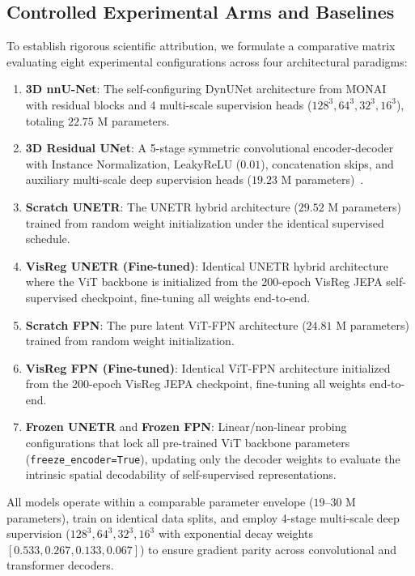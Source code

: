 \documentclass{article}
\begin{document}
\subsection{Controlled Experimental Arms and Baselines}
\label{sec:baselines}

To establish rigorous scientific attribution, we formulate a comparative matrix evaluating eight experimental configurations across four architectural paradigms:
\begin{enumerate}
    \item \textbf{3D nnU-Net}: The self-configuring DynUNet architecture from MONAI~\citep{isensee2021nnunet} with residual blocks and 4 multi-scale supervision heads ($128^3, 64^3, 32^3, 16^3$), totaling $22.75\text{ M}$ parameters.
    \item \textbf{3D Residual UNet}: A 5-stage symmetric convolutional encoder-decoder with Instance Normalization, LeakyReLU ($0.01$), concatenation skips, and auxiliary multi-scale deep supervision heads ($19.23\text{ M}$ parameters)~\citep{ronneberger2015u,cciccek20163d}.
    \item \textbf{Scratch UNETR}: The UNETR hybrid architecture ($29.52\text{ M}$ parameters) trained from random weight initialization under the identical supervised schedule.
    \item \textbf{VisReg UNETR (Fine-tuned)}: Identical UNETR hybrid architecture where the ViT backbone is initialized from the 200-epoch VisReg JEPA self-supervised checkpoint, fine-tuning all weights end-to-end.
    \item \textbf{Scratch FPN}: The pure latent ViT-FPN architecture ($24.81\text{ M}$ parameters) trained from random weight initialization.
    \item \textbf{VisReg FPN (Fine-tuned)}: Identical ViT-FPN architecture initialized from the 200-epoch VisReg JEPA checkpoint, fine-tuning all weights end-to-end.
    \item \textbf{Frozen UNETR} and \textbf{Frozen FPN}: Linear/non-linear probing configurations that lock all pre-trained ViT backbone parameters (\texttt{freeze\_encoder=True}), updating only the decoder weights to evaluate the intrinsic spatial decodability of self-supervised representations.
\end{enumerate}
All models operate within a comparable parameter envelope ($19\text{--}30\text{ M}$ parameters), train on identical data splits, and employ 4-stage multi-scale deep supervision ($128^3, 64^3, 32^3, 16^3$ with exponential decay weights $[0.533, 0.267, 0.133, 0.067]$) to ensure gradient parity across convolutional and transformer decoders.
\end{document}
